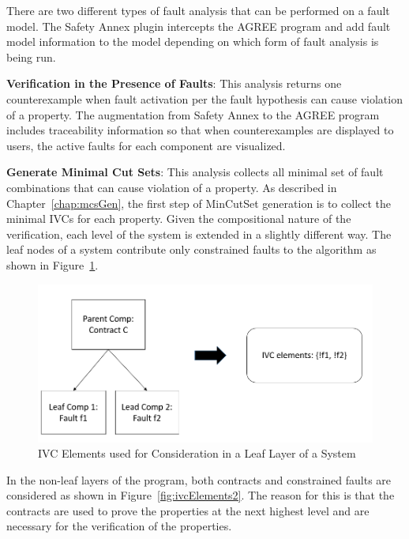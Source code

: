 There are two different types of fault analysis that can be performed on a fault model. The Safety Annex plugin intercepts the AGREE program and add fault model information to the model depending on which form of fault analysis is being run.

\textbf{Verification in the Presence of Faults}: This analysis returns one counterexample when fault activation per the fault hypothesis can cause violation of a property. The augmentation from Safety Annex to the AGREE program includes traceability information so that when counterexamples are displayed to users, the active faults for each component are visualized.

\textbf{Generate Minimal Cut Sets}: This analysis collects all minimal set of fault combinations that can cause violation of a property. As described in Chapter~\ref{chap:mcsGen}, the first step of MinCutSet generation is to collect the minimal IVCs for each property. Given the compositional nature of the verification, each level of the system is extended in a slightly different way. The leaf nodes of a system contribute only constrained faults to the \aivcalg algorithm as shown in Figure~\ref{fig:ivcElements1}. 

\begin{figure}[h!]
	\hspace*{-2cm}
	\vspace{-0.1in} 
	\begin{center}
		\includegraphics[scale=0.5]{images/ivcElements1.png}
	\caption{IVC Elements used for Consideration in a Leaf Layer of a System}
		\label{fig:ivcElements1}
	\end{center}
\end{figure}

In the non-leaf layers of the program, both contracts and constrained faults are considered as shown in Figure~\ref{fig:ivcElements2}. The reason for this is that the contracts are used to prove the properties at the next highest level and are necessary for the verification of the properties. 

